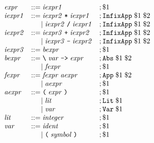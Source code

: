 \documentclass[12pt]{article}
\newcommand*{\BNFassign}{\mathrel{::=}}
\newcommand*{\BNFor}{\hspace{1.4em}\mid}
\newcommand*{\tokenc}[1]{\text{\texttt{#1}}}
\begin{document}
\pagestyle{empty}

\begin{align*}
  \begin{array}{lll}
  \mathit{expr}
  &\BNFassign \mathit{iexpr1} &;\$1 \\
  \mathit{iexpr1}
  &\BNFassign \mathit{iexpr2}\;\tokenc{*}\;\mathit{iexpr1} &;\tokenc{InfixApp}\;\$1\;\$2 \\
  &\BNFor \mathit{iexpr2}\;\tokenc{/}\;\mathit{iexpr1} &;\tokenc{InfixApp}\;\$1\;\$2 \\
  \mathit{iexpr2}
  &\BNFassign \mathit{iexpr3}\;\tokenc{+}\;\mathit{iexpr2} &;\tokenc{InfixApp}\;\$1\;\$2 \\
  &\BNFor \mathit{iexpr3}\;\tokenc{-}\;\mathit{iexpr2} &;\tokenc{InfixApp}\;\$1\;\$2 \\
  \mathit{iexpr3}
  &\BNFassign \mathit{bexpr} &;\$1 \\
  \mathit{bexpr}
  &\BNFassign \tokenc{\textbackslash}\;\mathit{var}\;\tokenc{->}\;\mathit{expr} &;\tokenc{Abs}\;\$1\;\$2 \\
  &\BNFor \mathit{fexpr} &;\$1 \\
  \mathit{fexpr}
  &\BNFassign \mathit{fexpr}\;\mathit{aexpr} &;\tokenc{App}\;\$1\;\$2 \\
  &\BNFor \mathit{aexpr} &;\$1 \\
  \mathit{aexpr}
  &\BNFassign \tokenc{(}\;\mathit{expr}\;\tokenc{)} &;\$1 \\
  &\BNFor \mathit{lit} &;\tokenc{Lit}\;\$1 \\
  &\BNFor \mathit{var} &;\tokenc{Var}\;\$1 \\
  \mathit{lit}
  &\BNFassign \mathit{integer} &;\$1 \\
  \mathit{var}
  &\BNFassign \mathit{ident} &;\$1 \\
  &\BNFor \tokenc{(}\;\mathit{symbol}\;\tokenc{)} &;\$1
  \end{array}
\end{align*}
\end{document}
